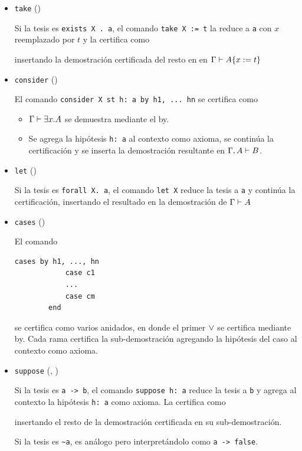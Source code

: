 \begin{itemize}
    \item \lstinline{take} ()

    Si la tesis es \lstinline{exists X . a}, el comando \lstinline{take X := t}
    la reduce a \lstinline{a} con $x$ reemplazado por $t$ y la certifica como
    
    \proofTreeExistsI

    insertando la demostración certificada del resto en en $\Gamma \vdash A \{x := t\}$

    \item \lstinline{consider} ()
    
    El comando \lstinline{consider X st h: a by h1, ... hn} se certifica como
    
    \proofTreeExistsE

    \begin{itemize}
        \item $\Gamma \vdash \exists x . A$ se demuestra mediante el by.
        \item Se agrega la hipótesis \lstinline{h: a} al contexto como axioma, se continúa la certificación y se inserta la demostración resultante en $\Gamma, A \vdash B$.
    \end{itemize}

    \item \lstinline{let} ()
    
    Si la tesis es \lstinline{forall X. a}, el comando \lstinline{let X} reduce la tesis a \lstinline{a} y continúa la certificación, insertando el resultado en la demostración de $\Gamma \vdash A$

    \proofTreeForallI

    \item \lstinline{cases} ()
    
    El comando
    \begin{lstlisting}[numbers=none]
        cases by h1, ..., hn
            case c1
            ...
            case cm
        end
    \end{lstlisting}

    se certifica como varios  anidados, en donde el primer $\vee$ se certifica mediante by. Cada rama certifica la sub-demostración agregando la hipótesis del caso al contexto como axioma.

    \proofTreeOrE

    \item \lstinline{suppose} (, )
    
    Si la tesis es \lstinline{a -> b}, el comando \lstinline{suppose h: a} reduce la tesis a \lstinline{b} y agrega al contexto la hipótesis \lstinline{h: a} como axioma. La certifica como

    \proofTreeImpI

    insertando el resto de la demostración certificada en su sub-demostración.

    Si la tesis es \lstinline{~a}, es análogo pero interpretándolo como \lstinline{a -> false}.

\end{itemize}

